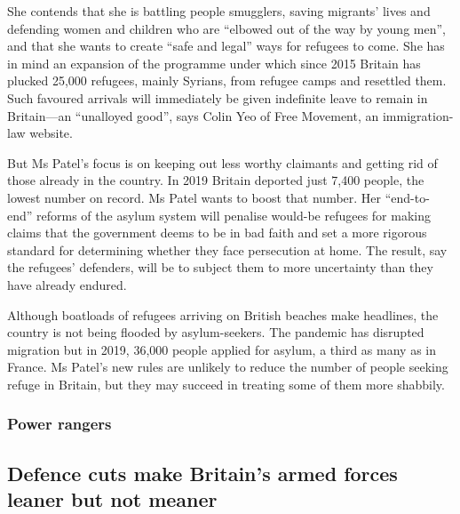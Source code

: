 \documentclass{article}
\begin{document}
She contends that she is battling people smugglers, saving migrants' lives and defending women and children who are ``elbowed out of the way by young men'', and that she wants to create ``safe and legal'' ways for refugees to come. She has in mind an expansion of the programme under which since 2015 Britain has plucked 25,000 refugees, mainly Syrians, from refugee camps and resettled them. Such favoured arrivals will immediately be given indefinite leave to remain in Britain---an ``unalloyed good'', says Colin Yeo of Free Movement, an immigration-law website. 

But Ms Patel's focus is on keeping out less worthy claimants and getting rid of those already in the country. In 2019 Britain deported just 7,400 people, the lowest number on record. Ms Patel wants to boost that number. Her ``end-to-end'' reforms of the asylum system will penalise would-be refugees for making claims that the government deems to be in bad faith and set a more rigorous standard for determining whether they face persecution at home. The result, say the refugees' defenders, will be to subject them to more uncertainty than they have already endured. 

Although boatloads of refugees arriving on British beaches make headlines, the country is not being flooded by asylum-seekers. The pandemic has disrupted migration but in 2019, 36,000 people applied for asylum, a third as many as in France. Ms Patel's new rules are unlikely to reduce the number of people seeking refuge in Britain, but they may succeed in treating some of them more shabbily.{} 
\clearpage
\subsubsection{Power rangers }
\subsection{Defence cuts make Britain's armed forces leaner but not meaner }
\end{document}
